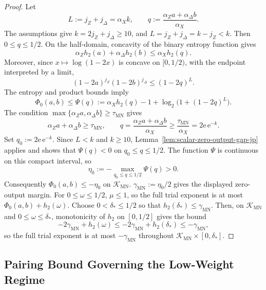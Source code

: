 \documentclass[11pt]{article}
\theoremstyle{definition}
\newcommand{\h}{h_2}
\begin{document}
\begin{proof}
Let
\[
L:=j_Z+j_\Delta=\alpha_X k,\qquad
q:=\frac{\alpha_Za+\alpha_\Delta b}{\alpha_X}.
\]
The assumptions give \(k=2j_Z+j_\Delta\ge10\), and \(L=j_Z+j_\Delta=k-j_Z<k\).
Then \(0\le q\le1/2\). On the half-domain, concavity of the binary entropy function gives
\[
\alpha_Z\h(a)+\alpha_\Delta\h(b)\le \alpha_X\h(q).
\]
Moreover, since \(x\mapsto \log(1-2x)\) is concave on \([0,1/2)\), with the endpoint interpreted by a limit,
\[
(1-2a)^{j_Z}(1-2b)^{j_\Delta}
\le
(1-2q)^L.
\]
The entropy and product bounds imply
\[
\Phi_0(a,b)\le
\Psi(q):=\alpha_X\h(q)-1+\log_2\!\bigl(1+(1-2q)^L\bigr).
\]
The condition \(\max\{\alpha_Za,\alpha_\Delta b\}\ge \tau_{\mathrm{MN}}\) gives
\[
\alpha_Za+\alpha_\Delta b\ge \tau_{\mathrm{MN}},
\qquad
q=\frac{\alpha_Za+\alpha_\Delta b}{\alpha_X}
\ge \frac{\tau_{\mathrm{MN}}}{\alpha_X}
=2\mathrm{e}\,\mathrm{e}^{-k}.
\]
Set \(q_0:=2\mathrm{e}\,\mathrm{e}^{-k}\).
Since \(L<k\) and \(k\ge10\), Lemma~\ref{lem:scalar-zero-output-gap-jp} applies and shows that \(\Psi(q)<0\) on \(q_0\le q\le1/2\). The function \(\Psi\) is continuous on this compact interval, so
\[
\eta_0:=-\max_{q_0\le q\le1/2}\Psi(q)>0.
\]
Consequently \(\Phi_0(a,b)\le-\eta_0\) on \(\mathcal K_{\mathrm{MN}}\).
\(\gamma_{\mathrm{MN}}:=\eta_0/2\) gives the displayed zero-output margin.
For \(0\le\omega\le1/2\), \(\mu\le1\), so the full trial exponent is at most \(\Phi_0(a,b)+\h(\omega)\). Choose \(0<\delta_*\le1/2\) so that \(\h(\delta_*)\le\gamma_{\mathrm{MN}}\). Then, on \(\mathcal K_{\mathrm{MN}}\) and \(0\le\omega\le\delta_*\), monotonicity of \(\h\) on \([0,1/2]\) gives the bound
\[
-2\gamma_{\mathrm{MN}}+\h(\omega)
\le -2\gamma_{\mathrm{MN}}+\h(\delta_*)
\le -\gamma_{\mathrm{MN}},
\]
so the full trial exponent is at most \(-\gamma_{\mathrm{MN}}\) throughout
\(\mathcal K_{\mathrm{MN}}\times[0,\delta_*]\).
\end{proof}

\subsection{Pairing Bound Governing the Low-Weight Regime}
\end{document}
